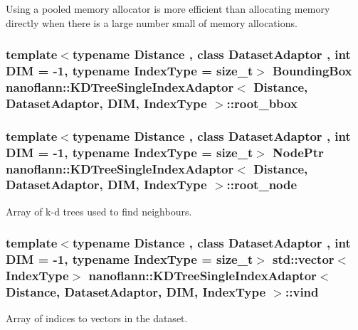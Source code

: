 Using a pooled memory allocator is more efficient than allocating memory directly when there is a large number small of memory allocations. \hypertarget{classnanoflann_1_1_k_d_tree_single_index_adaptor_a691ddd52bbdb882177cc21d1162df05b}{
\subsubsection[{root\-\_\-bbox}]{\setlength{\rightskip}{0pt plus 5cm}template$<$typename Distance , class Dataset\-Adaptor , int D\-I\-M = -\/1, typename Index\-Type  = size\-\_\-t$>$ {\bf Bounding\-Box} {\bf nanoflann\-::\-K\-D\-Tree\-Single\-Index\-Adaptor}$<$ Distance, Dataset\-Adaptor, D\-I\-M, Index\-Type $>$\-::root\-\_\-bbox\hspace{0.3cm}{\ttfamily [protected]}}}\label{classnanoflann_1_1_k_d_tree_single_index_adaptor_a691ddd52bbdb882177cc21d1162df05b}
\hypertarget{classnanoflann_1_1_k_d_tree_single_index_adaptor_a1dd45d22dddb21bdd30695ac5e443364}{
\subsubsection[{root\-\_\-node}]{\setlength{\rightskip}{0pt plus 5cm}template$<$typename Distance , class Dataset\-Adaptor , int D\-I\-M = -\/1, typename Index\-Type  = size\-\_\-t$>$ {\bf Node\-Ptr} {\bf nanoflann\-::\-K\-D\-Tree\-Single\-Index\-Adaptor}$<$ Distance, Dataset\-Adaptor, D\-I\-M, Index\-Type $>$\-::root\-\_\-node\hspace{0.3cm}{\ttfamily [protected]}}}\label{classnanoflann_1_1_k_d_tree_single_index_adaptor_a1dd45d22dddb21bdd30695ac5e443364}
Array of k-\/d trees used to find neighbours. \hypertarget{classnanoflann_1_1_k_d_tree_single_index_adaptor_a6d870be761aaf13d1a9b318d4d448469}{
\subsubsection[{vind}]{\setlength{\rightskip}{0pt plus 5cm}template$<$typename Distance , class Dataset\-Adaptor , int D\-I\-M = -\/1, typename Index\-Type  = size\-\_\-t$>$ std\-::vector$<$Index\-Type$>$ {\bf nanoflann\-::\-K\-D\-Tree\-Single\-Index\-Adaptor}$<$ Distance, Dataset\-Adaptor, D\-I\-M, Index\-Type $>$\-::vind\hspace{0.3cm}{\ttfamily [protected]}}}\label{classnanoflann_1_1_k_d_tree_single_index_adaptor_a6d870be761aaf13d1a9b318d4d448469}
Array of indices to vectors in the dataset. 

